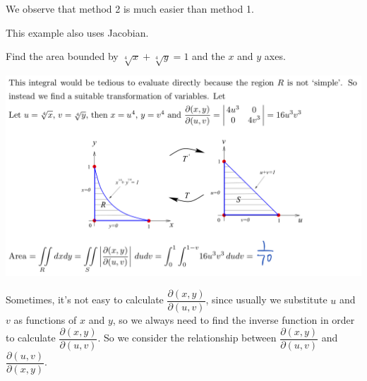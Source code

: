 \begin{spacing}{1.3}
    We observe that method 2 is much easier than method 1.


    \newpage
    {\blue This example also uses Jacobian.}

    \eg Find the area bounded by $\sqrt[4]{x}+\sqrt[4]{y}=1$ and the $x$ and $y$ axes.

    \sol

    \includegraphics[scale=0.28]{images/Ch14-jacobian-eg2.jpeg}


    \newpage
    Sometimes, it's not easy to calculate $\dfrac{\partial(x, y)}{\partial(u, v)}$, 
    since usually we substitute $u$ and $v$ as functions of $x$ and $y$, so we always need to find the inverse 
    function in order to calculate $\dfrac{\partial(x, y)}{\partial(u, v)}$. So we consider the relationship 
    between  $\dfrac{\partial(x, y)}{\partial(u, v)}$ and $\dfrac{\partial(u, v)}{\partial(x, y)}$.


\end{spacing}
